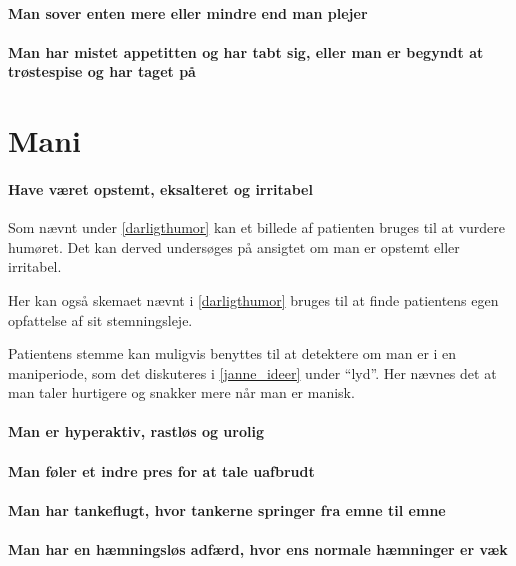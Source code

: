 \paragraph{Man sover enten mere eller mindre end man plejer}
\paragraph{Man har mistet appetitten og har tabt sig, eller man er begyndt at trøstespise og har taget på}


\section{Mani}

\paragraph{Have været opstemt, eksalteret og irritabel}
Som nævnt under \cref{darligthumor} kan et billede af patienten bruges til at vurdere humøret. 
Det kan derved undersøges på ansigtet om man er opstemt eller irritabel.

Her kan også skemaet nævnt i \cref{darligthumor} bruges til at finde patientens egen opfattelse af sit stemningsleje.

Patientens stemme kan muligvis benyttes til at detektere om man er i en maniperiode, som det diskuteres i \cref{janne_ideer} under ``lyd''. 
Her nævnes det at man taler hurtigere og snakker mere når man er manisk.


\paragraph{Man er hyperaktiv, rastløs og urolig}


\paragraph{Man føler et indre pres for at tale uafbrudt}

\paragraph{Man har tankeflugt, hvor tankerne springer fra emne til emne}

\paragraph{Man har en hæmningsløs adfærd, hvor ens normale hæmninger er væk}

